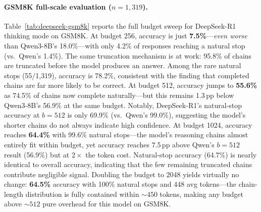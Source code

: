 \paragraph{GSM8K full-scale evaluation ($n{=}1{,}319$).}
Table~\ref{tab:deepseek-gsm8k} reports the full budget sweep for DeepSeek-R1 thinking
mode on GSM8K.
At budget 256, accuracy is just \textbf{7.5\%}---\emph{even worse} than Qwen3-8B's 18.0\%---with
only 4.2\% of responses reaching a natural stop (vs.\ Qwen's 1.4\%).
The same truncation mechanism is at work: 95.8\% of chains are truncated before the
model produces an answer.
Among the rare natural stops (55/1,319), accuracy is 78.2\%, consistent with the
finding that completed chains are far more likely to be correct.
At budget 512, accuracy jumps to \textbf{55.6\%} as 74.5\% of chains now complete naturally---but
this remains 1.3\,pp below Qwen3-8B's 56.9\% at the same budget.
Notably, DeepSeek-R1's natural-stop accuracy at $b{=}512$ is only 69.9\% (vs.\ Qwen's 99.0\%),
suggesting the model's shorter chains do not always indicate high confidence.
At budget 1024, accuracy reaches \textbf{64.4\%} with 99.6\% natural stops---the model's reasoning chains almost entirely fit within budget, yet accuracy reaches 7.5\,pp above Qwen's $b{=}512$ result (56.9\%) but at $2\times$ the token cost.
Natural-stop accuracy (64.7\%) is nearly identical to overall accuracy, indicating that the few remaining truncated chains contribute negligible signal.
Doubling the budget to 2048 yields virtually no change: \textbf{64.5\%} accuracy with 100\% natural stops and 448 avg tokens---the chain-length distribution is fully contained within ${\sim}450$ tokens, making any budget above ${\sim}512$ pure overhead for this model on GSM8K.

